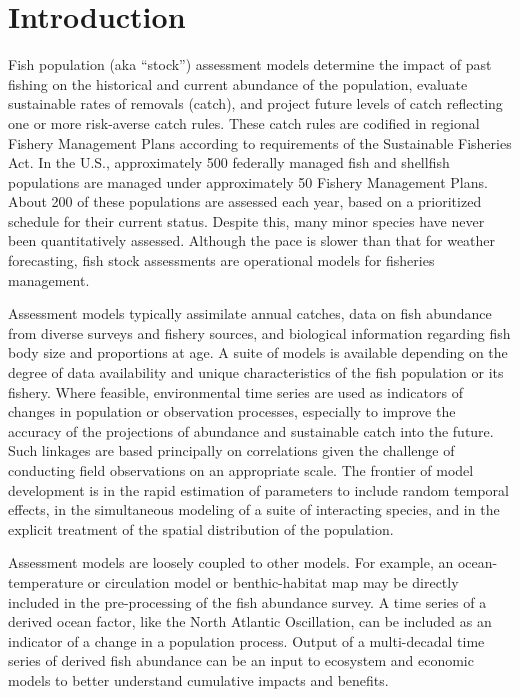 \hypertarget{intro}{}
\section{Introduction}

Fish population (aka ``stock'') assessment models determine the impact of past fishing on the historical and current abundance of the population, evaluate sustainable rates of removals (catch), and project future levels of catch reflecting one or more risk-averse catch rules. These catch rules are codified in regional Fishery Management Plans according to requirements of the Sustainable Fisheries Act. In the U.S., approximately 500 federally managed fish and shellfish populations are managed under approximately 50 Fishery Management Plans. About 200 of these populations are assessed each year, based on a prioritized schedule for their current status. Despite this, many minor species have never been quantitatively assessed. Although the pace is slower than that for weather forecasting, fish stock assessments are operational models for fisheries management.

Assessment models typically assimilate annual catches, data on fish abundance from diverse surveys and fishery sources, and biological information regarding fish body size and proportions at age. A suite of models is available depending on the degree of data availability and unique characteristics of the fish population or its fishery. Where feasible, environmental time series are used as indicators of changes in population or observation processes, especially to improve the accuracy of the projections of abundance and sustainable catch into the future. Such linkages are based principally on correlations given the challenge of conducting field observations on an appropriate scale. The frontier of model development is in the rapid estimation of parameters to include random temporal effects, in the simultaneous modeling of a suite of interacting species, and in the explicit treatment of the spatial distribution of the population.

Assessment models are loosely coupled to other models. For example, an ocean-temperature or circulation model or benthic-habitat map may be directly included in the pre-processing of the fish abundance survey. A time series of a derived ocean factor, like the North Atlantic Oscillation, can be included as an indicator of a change in a population process. Output of a multi-decadal time series of derived fish abundance can be an input to ecosystem and economic models to better understand cumulative impacts and benefits. 

